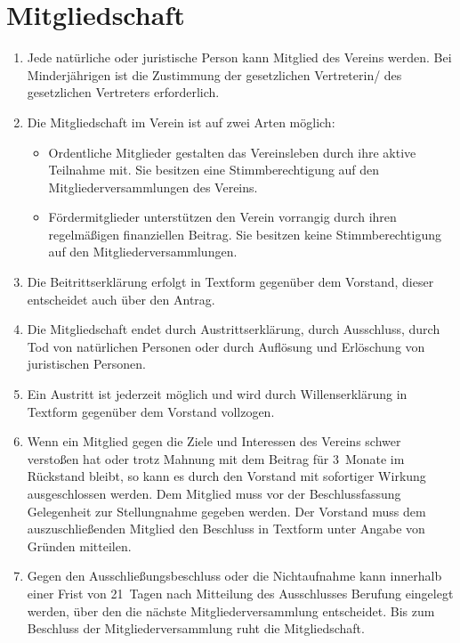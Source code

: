 \documentclass[a4paper,12pt]{scrartcl}
\begin{document}
\section{Mitgliedschaft}
\begin{enumerate}
  \item Jede natürliche oder juristische Person kann Mitglied des Vereins
    werden. Bei Minderjährigen ist die Zustimmung der gesetzlichen Vertreterin/
	des gesetzlichen Vertreters erforderlich.
  \item Die Mitgliedschaft im Verein ist auf zwei Arten möglich:
    \begin{itemize}
      \item Ordentliche Mitglieder gestalten das Vereinsleben durch ihre aktive
        Teilnahme mit. Sie besitzen eine Stimmberechtigung auf den
        Mitgliederversammlungen des Vereins.
      \item Fördermitglieder unterstützen den Verein vorrangig durch ihren
        regelmäßigen finanziellen Beitrag. Sie besitzen keine Stimmberechtigung
        auf den Mitgliederversammlungen.
    \end{itemize}
  \item Die Beitrittserklärung erfolgt in Textform gegenüber dem Vorstand,
    dieser entscheidet auch über den Antrag.
  \item Die Mitgliedschaft endet durch Austrittserklärung, durch Ausschluss,
    durch Tod von natürlichen Personen oder durch Auflösung und Erlöschung von
    juristischen Personen.
  \item Ein Austritt ist jederzeit möglich und wird durch Willenserklärung in
    Textform gegenüber dem Vorstand vollzogen.
  \item Wenn ein Mitglied gegen die Ziele und Interessen des Vereins schwer
    verstoßen hat oder trotz Mahnung mit dem Beitrag für 3~Monate im Rückstand
    bleibt, so kann es durch den Vorstand mit sofortiger Wirkung ausgeschlossen
    werden. Dem Mitglied muss vor der Beschlussfassung Gelegenheit zur
    Stellungnahme gegeben werden. Der Vorstand muss dem auszuschließenden
    Mitglied den Beschluss in Textform unter Angabe von Gründen mitteilen. 
  \item Gegen den Ausschließungsbeschluss oder die Nichtaufnahme kann innerhalb 
    einer Frist von 21~Tagen nach Mitteilung des Ausschlusses Berufung eingelegt
    werden, über den die nächste Mitgliederversammlung entscheidet. Bis zum 
    Beschluss der Mitgliederversammlung ruht die Mitgliedschaft.
\end{enumerate}
\end{document}
